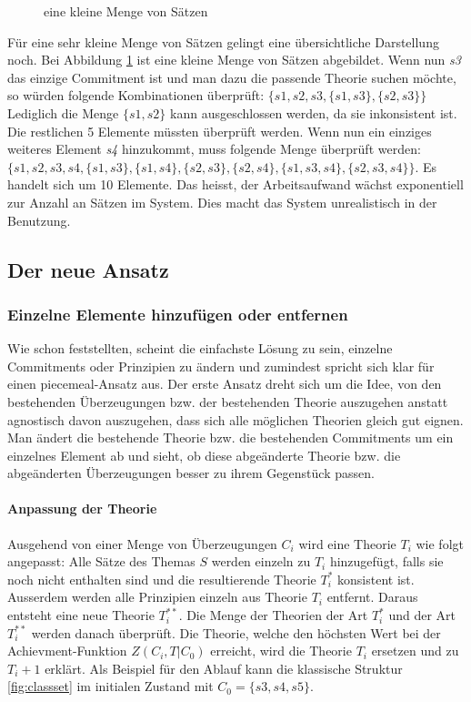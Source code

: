 \documentclass{article}
\begin{document}
\begin{figure}[htbp]
  \centering
  
  \caption{eine kleine Menge von Sätzen\label{fig:smallset}}
\end{figure}

Für eine sehr kleine Menge von Sätzen gelingt eine übersichtliche Darstellung noch. Bei Abbildung \ref{fig:smallset} ist eine kleine Menge von Sätzen abgebildet. Wenn nun \textit{s3} das einzige Commitment ist und man dazu die passende Theorie suchen möchte, so würden folgende Kombinationen überprüft: $\{s1, s2, s3, \{s1,s3\}, \{s2,s3\}\}$ Lediglich die Menge $\{s1,s2\}$ kann ausgeschlossen werden, da sie inkonsistent ist. Die restlichen 5 Elemente müssten überprüft werden. Wenn nun ein einziges weiteres Element \textit{s4} hinzukommt, muss folgende Menge überprüft werden:\linebreak
$\{s1, s2, s3, s4, \{s1,s3\}, \{s1,s4\}, \{s2,s3\}, \{s2,s4\}, \{s1,s3,s4\}, \{s2,s3,s4\}\}$. Es handelt sich um 10 Elemente. Das heisst, der Arbeitsaufwand wächst exponentiell zur Anzahl an Sätzen im System. Dies macht das System unrealistisch in der Benutzung.



\subsection{Der neue Ansatz}

\subsubsection{Einzelne Elemente hinzufügen oder entfernen}
Wie \cite[S.25]{beisbart_making_2015} schon feststellten, scheint die einfachste Lösung zu sein, einzelne Commitments oder Prinzipien zu ändern und zumindest \citeauthor{goodman_fact_1983} spricht sich klar für einen piecemeal-Ansatz aus. Der erste Ansatz dreht sich um die Idee, von den bestehenden Überzeugungen bzw. der bestehenden Theorie auszugehen anstatt agnostisch davon auszugehen, dass sich alle möglichen Theorien gleich gut eignen. Man ändert die bestehende Theorie bzw. die bestehenden Commitments um ein einzelnes Element ab und sieht, ob diese abgeänderte Theorie bzw. die abgeänderten Überzeugungen besser zu ihrem Gegenstück passen.

\paragraph{Anpassung der Theorie}
Ausgehend von einer Menge von Überzeugungen $C_i$ wird eine Theorie $T_i$ wie folgt angepasst: Alle Sätze des Themas $S$ werden einzeln zu $T_i$ hinzugefügt, falls sie noch nicht enthalten sind und die resultierende Theorie $T_i^*$ konsistent ist. Ausserdem werden alle Prinzipien einzeln aus Theorie $T_i$ entfernt. Daraus entsteht eine neue Theorie $T_i^{**}$. Die Menge der Theorien der Art $T_i^*$ und der Art $T_i^{**}$ werden danach überprüft. Die Theorie, welche den höchsten Wert bei der Achievment-Funktion $Z(C_i,T|C_0)$ erreicht, wird die Theorie $T_i$ ersetzen und zu $T_i+1$ erklärt. Als Beispiel für den Ablauf kann die klassische Struktur \ref{fig:classset} im initialen Zustand mit $C_0 = \{s3, s4, s5\}$.
\end{document}
